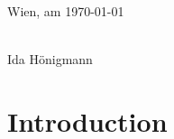 \documentclass[a4paper,11pt,bibliography=totoc,listof=totoc,headinclude=true,cleardoublepage=empty,oneside]{scrbook}
\begin{document}
\vspace*{3cm}

\noindent
Wien, am \today
%
\hfill 
%
\begin{minipage}[t]{5cm}
\centering
\underline{\hspace*{5cm}}\\
\small Ida Hönigmann
\end{minipage}

\cleardoublepage


\tableofcontents

\cleardoublepage
{} 

\chapter{Introduction}
\label{chapter:introduction}


\printbibliography
\end{document}
